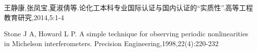 \documentclass[11pt,a4paper]{article}
\newcommand{\wuhao}{\fontsize{10.5pt}{18pt}\selectfont}
\newcommand\seccontent{
	\wuhao %
    \setlength{\parindent}{2em} %
    \setlength{\parskip}{0pt}
    }
\theoremstyle{definition} \newtheorem{law}[thm]{Law}
\theoremstyle{plain} \newtheorem{jury}[thm]{Jury}
\theoremstyle{remark} \newtheorem*{marg}{Margaret}
\numberwithin{equation}{section}
\begin{document}
\appendix
{}
\label{bibtexref}

\begin{thebibliography}{1}
	\label{latexref}
	\seccontent
	 王静康,张凤宝,夏淑倩等.论化工本科专业国际认证与国内认证的“实质性”.高等工程教育研究,2014,5:1-4

	 Stone J A, Howard L P. A simple technique for observing periodic nonlinearities in Michelson interferometers. Precision Engineering,1998,22(4):220-232

\end{thebibliography}
%	
\end{document}
